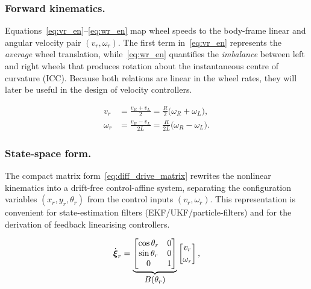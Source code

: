 \subsubsection{Forward kinematics.}
Equations~\eqref{eq:vr_en}–\eqref{eq:wr_en} map wheel speeds to the
body-frame linear and angular velocity pair \((v_r,\omega_r)\).
The first term in~\eqref{eq:vr_en} represents the \emph{average} wheel
translation, while~\eqref{eq:wr_en} quantifies the \emph{imbalance} between
left and right wheels that produces rotation about the instantaneous centre
of curvature (ICC).  
Because both relations are linear in the wheel rates, they will later be
useful in the design of velocity controllers.

\begin{align}
    v_r      &= \frac{v_R + v_L}{2}
              = \frac{R}{2}\bigl(\omega_R + \omega_L\bigr), \label{eq:vr_en}\\[4pt]
    \omega_r &= \frac{v_R - v_L}{2L}
              = \frac{R}{2L}\bigl(\omega_R - \omega_L\bigr). \label{eq:wr_en}
\end{align}

\subsubsection{State-space form.}
The compact matrix form~\eqref{eq:diff_drive_matrix} rewrites the nonlinear
kinematics into a drift-free control-affine system, separating the
configuration variables \((x_r,y_r,\theta_r)\) from the control inputs
\((v_r,\omega_r)\).  
This representation is convenient for state-estimation filters
(EKF/UKF/particle-filters) and for the derivation of feedback linearising
controllers.

\begin{equation}
    \dot{\boldsymbol{\xi}}_r =
    \underbrace{%
    \begin{bmatrix}
        \cos\theta_r & 0 \\
        \sin\theta_r & 0 \\
        0            & 1
    \end{bmatrix}}_{\displaystyle B(\theta_r)}
    \begin{bmatrix}
        v_r \\[2pt] \omega_r
    \end{bmatrix},
    \label{eq:diff_drive_matrix}
\end{equation}

